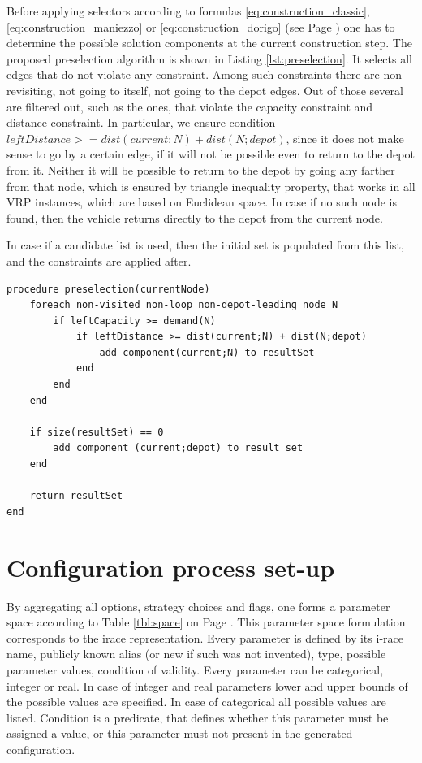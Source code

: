 \documentclass[11pt,a4paper,oneside]{book}
\begin{document}
Before applying selectors according to formulas \eqref{eq:construction_classic}, \eqref{eq:construction_maniezzo} or \eqref{eq:construction_dorigo} (see Page \pageref{eq:construction_classic}) one has to determine the possible solution components at the current construction step. The proposed preselection algorithm is shown in Listing \ref{lst:preselection}. It selects all edges that do not violate any constraint. Among such constraints there are non-revisiting, not going to itself, not going to the depot edges. Out of those several are filtered out, such as the ones, that violate the capacity constraint and distance constraint. In particular, we ensure condition $leftDistance >= dist(current;N) + dist(N;depot)$, since it does not make sense to go by a certain edge, if it will not be possible even to return to the depot from it. Neither it will be possible to return to the depot by going any farther from that node, which is ensured by triangle inequality property, that works in all VRP instances, which are based on Euclidean space. In case if no such node is found, then the vehicle returns directly to the depot from the current node.

In case if a candidate list is used, then the initial set is populated from this list, and the constraints are applied after.

\begin{minipage}[c, breaklines=true]{0.95\textwidth}
\begin{lstlisting}[caption={Solution component preselection pseudo-code}, label={lst:preselection}]
procedure preselection(currentNode)
	foreach non-visited non-loop non-depot-leading node N
		if leftCapacity >= demand(N)
			if leftDistance >= dist(current;N) + dist(N;depot)
				add component(current;N) to resultSet
			end
		end
	end
	
	if size(resultSet) == 0
		add component (current;depot) to result set
	end
		
	return resultSet
end
\end{lstlisting}
\end{minipage}


\section{Configuration process set-up}

By aggregating all options, strategy choices and flags, one forms a parameter space according to Table \ref{tbl:space} on Page \pageref{tbl:space}. This parameter space formulation corresponds to the irace representation. Every parameter is defined by its i-race name, publicly known alias (or new if such was not invented), type, possible parameter values, condition of validity. Every parameter can be categorical, integer or real. In case of integer and real parameters lower and upper bounds of the possible values are specified. In case of categorical all possible values are listed. Condition is a predicate, that defines whether this parameter must be assigned a value, or this parameter must not present in the generated configuration.
\end{document}
